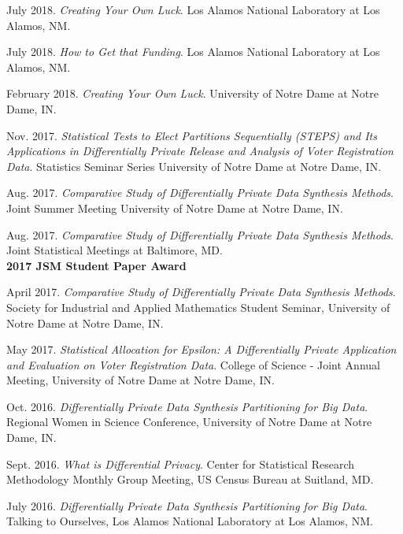 \documentclass[11pt, letterpaper, roman]{moderncv} %
\begin{document}
\begin{etaremune}[topsep=0pt, itemsep=6pt, partopsep=0pt, parsep=0pt]
  \item July 2018. \textit{Creating Your Own Luck}. Los Alamos National Laboratory at Los Alamos, NM.
  
  \item July 2018. \textit{How to Get that Funding}. Los Alamos National Laboratory at Los Alamos, NM.
  
  \item February 2018. \textit{Creating Your Own Luck}. University of Notre Dame at Notre Dame, IN.
  
  \item Nov. 2017. \textit{Statistical Tests to Elect Partitions Sequentially (STEPS) and Its Applications in Differentially Private Release and Analysis of Voter Registration Data}. Statistics Seminar Series University of Notre Dame at Notre Dame, IN.
  
  \item Aug. 2017. \textit{Comparative Study of Differentially Private Data Synthesis Methods}. Joint Summer Meeting University of Notre Dame at Notre Dame, IN.

  \item Aug. 2017. \textit{Comparative Study of Differentially Private Data Synthesis Methods}. Joint Statistical Meetings at Baltimore, MD.\\
  \textbf{2017 JSM Student Paper Award}
  
   \item April 2017. \textit{Comparative Study of Differentially Private Data Synthesis Methods}. Society for Industrial and Applied Mathematics Student Seminar, University of Notre Dame at Notre Dame, IN.
  
  \item May 2017. \textit{Statistical Allocation for Epsilon: A Differentially Private Application and Evaluation on Voter Registration Data}. College of Science - Joint Annual Meeting, University of Notre Dame at Notre Dame, IN.

  \item Oct. 2016. \textit{Differentially Private Data Synthesis Partitioning for Big Data}. Regional Women in Science Conference, University of Notre Dame at Notre Dame, IN. 

  \item Sept. 2016. \textit{What is Differential Privacy}. Center for Statistical Research Methodology Monthly Group Meeting, US Census Bureau at Suitland, MD. 

  \item July 2016. \textit{Differentially Private Data Synthesis Partitioning for Big Data}. Talking to Ourselves, Los Alamos National Laboratory at Los Alamos, NM.
  

\end{etaremune}
\end{document}
